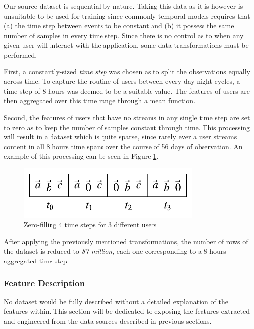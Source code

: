 \documentclass{kththesis}
\begin{document}
Our source dataset is sequential by nature. Taking this data as it is however is unsuitable to be used for training since commonly temporal models requires that (a) the time step between events to be constant and (b) it possess the same number of samples in every time step. Since there is no control as to when any given user will interact with the application, some data transformations must be performed. 

First, a constantly-sized \emph{time step} was chosen as to split the observations equally across time. To capture the routine of users between every day-night cycles, a time step of 8 hours was deemed to be a suitable value. The features of users are then aggregated over this time range through a mean function. 

Second, the features of users that have no streams in any single time step are set to zero as to keep the number of samples constant through time. This processing will result in a dataset which is quite sparse, since rarely ever a user streams content in all 8 hours time spans over the course of 56 days of observation. An example of this processing can be seen in Figure \ref{fig:zerofill}.

	\begin{figure}[h]
    \centering
    \includegraphics[width=0.8\textwidth,keepaspectratio]{figures/zero_fill.pdf}
    \caption{Zero-filling 4 time steps for 3 different users}
    \label{fig:zerofill}
	\end{figure}

After applying the previously mentioned transformations, the number of rows of the dataset is reduced to \emph{87 million}, each one corresponding to a 8 hours aggregated time step.

\subsubsection{Feature Description}

No dataset would be fully described without a detailed explanation of the features within. This section will be dedicated to exposing the features extracted and engineered from the data sources described in previous sections.
\end{document}
